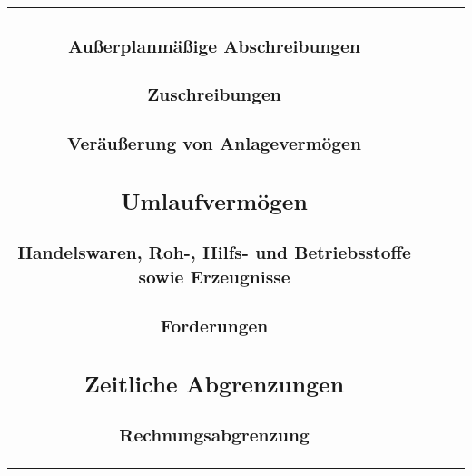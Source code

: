 \documentclass[paper=a4, fontsize=11pt]{scrartcl}
\numberwithin{equation}{section}
\numberwithin{figure}{section}
\numberwithin{table}{section}
\begin{document}
\begin{tabular}{cc|cc}

\subsubsection{Außerplanmäßige Abschreibungen}


\subsubsection{Zuschreibungen}


\subsubsection{Veräußerung von Anlagevermögen}


\subsection{Umlaufvermögen}


\subsubsection{Handelswaren, Roh-, Hilfs- und Betriebsstoffe sowie Erzeugnisse}


\subsubsection{Forderungen}


\subsection{Zeitliche Abgrenzungen}


\subsubsection{Rechnungsabgrenzung}


\end{tabular}
\end{document}
